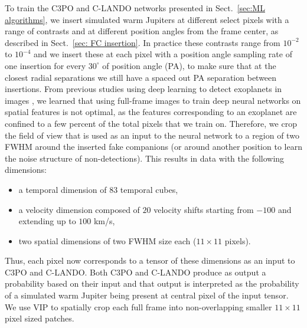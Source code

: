 \documentclass{aa}
\begin{document}
To train the C3PO and C-LANDO networks presented in Sect.~\ref{sec:ML algorithms}, we insert simulated warm Jupiters at different select pixels with a range of contrasts and at different position angles from the frame center, as described in Sect.~\ref{sec: FC insertion}.
In practice these contrasts range from $10^{-2}$ to $10^{-4}$ and we insert these at each pixel with a position angle sampling rate of one insertion for every $30^{\circ}$ of position angle (PA), to make sure that at the closest radial separations we still have a spaced out PA separation between insertions. From previous studies using deep learning to detect exoplanets in images \citep[e.g.,][]{2018Gomez,2023Carlito}, we learned that using full-frame images to train deep neural networks on spatial features is not optimal, as the features corresponding to an exoplanet are confined to a few percent of the total pixels that we train on. Therefore, we crop the field of view that is used as an input to the neural network to a region of two FWHM around the inserted fake companions (or around another position to learn the noise structure of non-detections).
This results in data with the following dimensions:
\begin{itemize}
    \item a temporal dimension of $83$ temporal cubes, 
    \item a velocity dimension composed of $20$ velocity shifts starting from $-100$ and extending up to $100$ km/s, 
    \item two spatial dimensions of two FWHM size each ($11\times 11$ pixels).
\end{itemize}
Thus, each pixel now corresponds to a tensor of these dimensions as an input to C3PO and C-LANDO.
Both C3PO and C-LANDO produce as output a probability based on their input and that output is interpreted as the probability of a simulated warm Jupiter being present at central pixel of the input tensor.
We use VIP to spatially crop each full frame into non-overlapping smaller $11\times11$ pixel sized patches.
\end{document}
